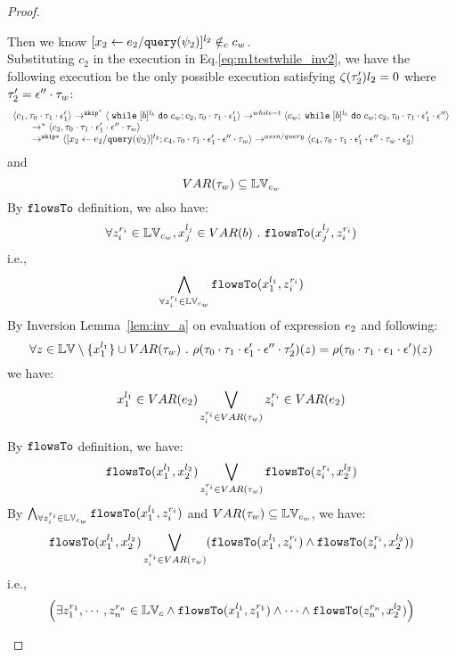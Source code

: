 {\begin{proof}
\begin{subproof}
%
%
Then we know $[\mathrel{ {x}_2 \leftarrow e_2 / {\tt query}(\psi_2) }]^{l_2} \notin_c c_w$.
%
\\
%
Substituting $c_2$ in the execution in Eq.\ref{eq:m1testwhile_inv2}, we have the following execution be the only possible execution satisfying $\mathtt{\zeta}(\mathtt{\tau}_2') l_2 = 0$ where $\mathtt{\tau}_2' = \mathtt{\epsilon}'' \cdot \mathtt{\tau}_w$:
\[
    \begin{array}{l}   
  \langle c_1, \mathtt{\tau}_0 \cdot \mathtt{\tau}_1 \cdot \mathtt{\epsilon}_1' \rangle 
  \rightarrow^{\mathtt{skip}^*} 
  \langle \;\mathtt{while}\; [b]^{l_b} \;\mathtt{do}\; c_w;{c}_2, \mathtt{\tau}_0 \cdot \mathtt{\tau}_1 \cdot \mathtt{\epsilon}_1' \rangle 
  \rightarrow^{while-t} 
  \langle c_w;\;\mathtt{while}\; [b]^{l_b} \;\mathtt{do}\; c_w;c_2, \mathtt{\tau}_0 \cdot \mathtt{\tau}_1 \cdot \mathtt{\epsilon}_1' \cdot \mathtt{\epsilon}'' \rangle 
  \\
  \qquad \rightarrow^{*} 
  \langle c_2,\mathtt{\tau}_0 \cdot \mathtt{\tau}_1 \cdot \mathtt{\epsilon}_1' \cdot \mathtt{\epsilon}'' \cdot \mathtt{\tau}_w \rangle
  \\
  \qquad \rightarrow^{\mathtt{skip}*} 
  \langle [\mathrel{ {x}_2 \leftarrow e_2 / {\tt query}(\psi_2) }]^{l_2};{c}_4, 
  \mathtt{\tau}_0 \cdot \mathtt{\tau}_1 \cdot \mathtt{\epsilon}_1' \cdot \mathtt{\epsilon}'' \cdot \mathtt{\tau}_w \rangle
  \rightarrow^{assn/query} 
  \langle {c}_4,  \mathtt{\tau}_0 \cdot \mathtt{\tau}_1 \cdot \mathtt{\epsilon}_1' \cdot \mathtt{\epsilon}'' \cdot \mathtt{\tau}_w \cdot \mathtt{\epsilon}_2' \rangle 
\end{array}
\]
and
\[
  VAR{(\mathtt{\tau}_w)} \subseteq \mathbb{LV}_{c_w}
\]
%
By $\mathtt{flowsTo}$ definition, we also have:
\[
  \forall z_i^{r_i} \in \mathbb{LV}_{c_w}, x_j^{l_j} \in VAR(b) ~.~
  \mathtt{flowsTo}(x_j^{l_j}, z_i^{r_i})
\]
i.e., 
\[
  \bigwedge_{\forall z_i^{r_i} \in \mathbb{LV}_{c_w}}
  \mathtt{flowsTo}(x_1^{l_1}, z_i^{r_i})
\]
%
By Inversion Lemma~\ref{lem:inv_a} on evaluation of expression $e_2$ and following: 
\[
  \forall z \in \mathbb{LV} \setminus \{x_1^{l_1}\} \cup VAR{(\mathtt{\tau}_w)} ~.~
  \rho(\mathtt{\tau}_0 \cdot \mathtt{\tau}_1 \cdot \mathtt{\epsilon}_1'\cdot \mathtt{\epsilon}'' \cdot \mathtt{\tau}_2')(z) 
  = \rho(\mathtt{\tau}_0 \cdot \mathtt{\tau}_1 \cdot \mathtt{\epsilon}_1\cdot \mathtt{\epsilon}')(z)
\]
%
we have:
\[
  x_1^{l_1} \in VAR(e_2) \bigvee_{z_i^{r_i} \in VAR{(\mathtt{\tau}_w)}} z_i^{r_i} \in VAR(e_2)
\]
%
\item By $\mathtt{flowsTo}$ definition, we have:
\[
   \mathtt{flowsTo}(x_1^{l_1}, x_2^{l_2}) \bigvee_{z_i^{r_i} \in VAR{(\mathtt{\tau}_w)}} \mathtt{flowsTo}(z_i^{r_i}, x_2^{l_2})
\]
%
By $ \bigwedge_{\forall z_i^{r_i} \in \mathbb{LV}_{c_w}} \mathtt{flowsTo}(x_1^{l_1}, z_i^{r_i})$ and $VAR{(\mathtt{\tau}_w)} \subseteq \mathbb{LV}_{c_w}$, we have:
\[
\mathtt{flowsTo}(x_1^{l_1}, x_2^{l_2}) \bigvee_{z_i^{r_i} \in VAR{(\mathtt{\tau}_w)}} 
(\mathtt{flowsTo}(x_1^{l_1}, z_i^{r_i}) \land \mathtt{flowsTo}(z_i^{r_i}, x_2^{l_2}))
\]
%
i.e.,
\[
\Big(\exists z_1^{r_1}, \cdots, z_n^{r_n} \in \mathbb{LV}_{{c}}
 \land \mathtt{flowsTo}(x_1^{l_1}, z_1^{r_1}) \land \cdots \land \mathtt{flowsTo}(z_n^{r_n}, {x}_2^{l_2}) \Big)
\]
\end{subproof}
\end{proof}}
